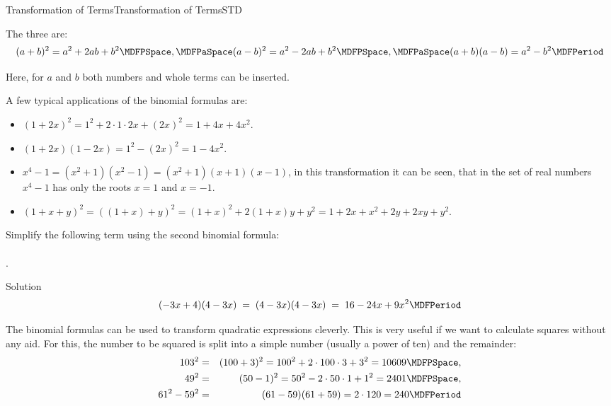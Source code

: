\begin{MXContent}{Transformation of Terms}{Transformation of Terms}{STD}
\begin{MInfo}
The three  are:
$$ (a+b)^2 = a^2+2a b+b^2 \MDFPSpace, \MDFPaSpace (a-b)^2 = a^2-2a b+b^2 \MDFPSpace,\MDFPaSpace (a+b)(a-b) = a^2-b^2 \MDFPeriod $$
\end{MInfo}


Here, for $a$ and $b$ both numbers and whole terms can be inserted.

\begin{MExample}
A few typical applications of the binomial formulas are:
\begin{itemize}
\item{$(1+2x)^2=1^2+2\cdot1\cdot 2x+(2x)^2=1+4x+4x^2$.}
\item{$(1+2x)(1-2x)=1^2-(2x)^2=1-4x^2$.}
\item{$x^4-1=(x^2+1)(x^2-1)=(x^2+1)(x+1)(x-1)$, in this transformation it can be seen, that in the set 
of real numbers $x^4-1$ has only the roots $x=1$ and $x=-1$.}
\item{$(1+x+y)^2=\left({(1+x)+y}\right)^2= (1+x)^2+2(1+x)y+y^2=1+2x+x^2+2y+2x y+y^2$.}
\end{itemize}
\end{MExample}

\begin{MExercise}
Simplify the following term using the second binomial formula:\ \\ \ \\
.

\begin{MHint}{Solution}$$(-3x+4)(4-3x)\;=\; (4-3x)(4-3x)\;=\; 16-24x+9x^2 \MDFPeriod $$\end{MHint}
\end{MExercise}

\begin{MExample}%
The binomial formulas can be used to transform quadratic expressions cleverly.
This is very useful if we want to calculate squares without any aid. For this, the number to be 
squared is split into a simple number (usually a power of ten) and the remainder:
\begin{eqnarray*}
103^2 & = & (100+3)^2 = 100^2+2\cdot 100\cdot 3+3^2 = 10609 \MDFPSpace,\\
49^2 & = & (50-1)^2 = 50^2-2\cdot 50\cdot 1 +1^2 = 2401 \MDFPSpace,\\
61^2-59^2 & = & (61-59)(61+59) = 2\cdot 120 = 240 \MDFPeriod
\end{eqnarray*}
\end{MExample}


\end{MXContent}
